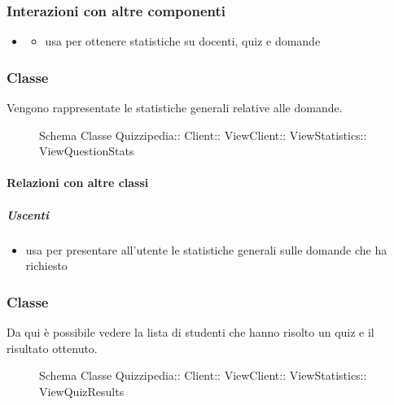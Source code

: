 \subsubsection{Interazioni con altre componenti}
\begin{itemize}
\item {}
\begin{itemize}
\item usa  per ottenere statistiche su docenti, quiz e domande
\end{itemize}
\end{itemize}
\subsubsection{Classe }
Vengono rappresentate le statistiche generali relative alle domande.
\begin{figure}[H]
\centering
\noindent{}
\caption[Schema Classe ViewQuestionStats]{Schema Classe Quizzipedia:: Client:: ViewClient:: ViewStatistics:: ViewQuestionStats}
\end{figure}
\paragraph{Relazioni con altre classi}
\subparagraph{Uscenti}
\begin{itemize}
\item usa  per presentare all'utente le statistiche generali sulle domande che ha richiesto
\end{itemize}
\subsubsection{Classe }
Da qui è possibile vedere la lista di studenti che hanno risolto un quiz e il risultato ottenuto.
\begin{figure}[H]
\centering
\noindent{}
\caption[Schema Classe ViewQuizResults]{Schema Classe Quizzipedia:: Client:: ViewClient:: ViewStatistics:: ViewQuizResults}
\end{figure}
